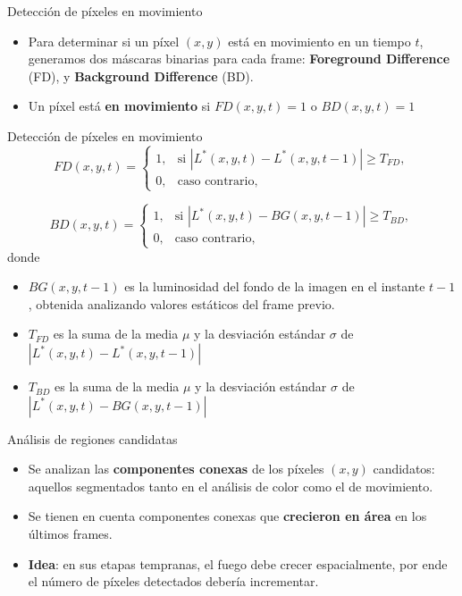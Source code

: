 \documentclass{beamer}
\begin{document}
\begin{frame}{Detección de píxeles en movimiento}
\begin{itemize}
    \item Para determinar si un píxel $(x,y)$ está en movimiento en un tiempo $t$, generamos dos máscaras binarias para cada frame: \textbf{Foreground Difference} (FD), y \textbf{Background Difference} (BD).     
    \item Un píxel está \textbf{en movimiento} si $FD(x,y,t) = 1$ o $BD(x,y,t) = 1$
\end{itemize}
\end{frame}
\begin{frame}{Detección de píxeles en movimiento}
    \[
FD(x,y,t) = 
\begin{cases}
    1, & \text{si } \left| L^*(x,y,t) - L^*(x,y,t-1) \right| \geq T_{FD}, \\
    0, & \text{caso contrario,}
\end{cases}
\]

\[
BD(x,y,t) = 
\begin{cases}
    1, & \text{si } \left| L^*(x,y,t) - BG(x,y,t-1) \right| \geq T_{BD}, \\
    0, & \text{caso contrario,}
\end{cases}
\]
donde
\begin{itemize}
    \item $BG(x,y,t-1)$ es la luminosidad del fondo de la imagen en el instante $t-1$, obtenida analizando valores estáticos del frame previo. 

    \item $T_{FD}$ es la suma de la media $\mu$ y la desviación estándar $\sigma$ de $\left| L^*(x,y,t) - L^*(x,y,t-1) \right|$

    \item $T_{BD}$ es la suma de la media $\mu$ y la desviación estándar $\sigma$ de $\left| L^*(x,y,t) - BG(x,y,t-1) \right|$
        
\end{itemize}
\end{frame}

\begin{frame}{Análisis de regiones candidatas}
\begin{itemize}
    \item Se analizan las \textbf{componentes conexas} de los píxeles $(x,y)$ candidatos: aquellos segmentados tanto en el análisis de color como el de movimiento. 
    \item Se tienen en cuenta componentes conexas que \textbf{crecieron en área} en los últimos frames.
    \item \textbf{Idea}: en sus etapas tempranas, el fuego debe crecer espacialmente, por ende el número de píxeles detectados debería incrementar.
\end{itemize}
\end{frame}
\end{document}
